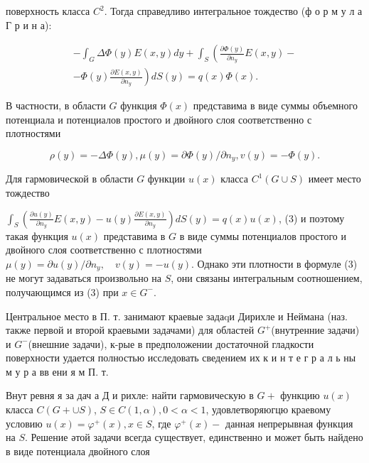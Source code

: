 \documentclass[10pt]{article}
\begin{document}
поверхность класса $C^{2}$. Тогда справедливо интегральное тождество (ф о р м у л а Г р и н а):



\[

\begin{gathered}

-\int_{G} \Delta \Phi(y) E(x, y) d y+\int_{S}\left(\frac{\partial \Phi(y)}{\partial n_{y}} E(x, y)-\right. \\

\left.-\Phi(y) \frac{\partial E(x, y)}{\partial n_{y}}\right) d S(y)=q(x) \Phi(x) .

\end{gathered}

\]



В частности, в области $G$ функция $\Phi(x)$ представима в виде суммы объемного потенциала и потенциалов простого и двойного слоя соответственно с плотностями



\[

\rho(y)=-\Delta \Phi(y), \mu(y)=\partial \Phi(y) / \partial n_{y}, v(y)=-\Phi(y) .

\]



Для гармовической в области $G$ функции $u(x)$ класса $C^{1}(G \cup S)$ имеет место тождество



$\int_{S}\left(\frac{\partial u(y)}{\partial n_{y}} E(x, y)-u(y) \frac{\partial E(x, y)}{\partial n_{y}}\right) d S(y)=q(x) u(x)$, (3) и поэтому такая функция $u(x)$ представима в $G$ в виде суммы потенциалов простого и двойного слоя соответственно с плотностями $\mu(y)=\partial u(y) / \partial n_{y}, \quad v(y)=-u(y)$. Однако эти плотности в формуле (3) не могут задаваться произвольно на $S$, они связаны интегральным соотношением, получающимся из (3) при $x \in G^{-}$.



Центральное место в П. т. занимают краевые задаqи Дирихле и Неймана (наз. также первой и второй краевыми задачами) для областей $G^{+}$(внутренние задачи) и $G^{-}$(внешние задачи), к-рые в предположении достаточной гладкости поверхности удается полностью исследовать сведением их к и н т е г р а л ь ны м у р а вв ени я м П. т.



Внут ревня я за дач а Д и рихле: найти гармовическую в $G+$ функцию $u(x)$ класса $C(G+\cup S)$, $S \in C(1, \alpha), 0<\alpha<1$, удовлетворяюгцю краевому условию $u(x)=\varphi^{+}(x), x \in S$, где $\varphi^{+}(x)-$ данная непрерывная функция на $S$. Решение әтой задачи всегда существует, единственно и может быть найдено в виде потенциала двойного слоя
\end{document}
